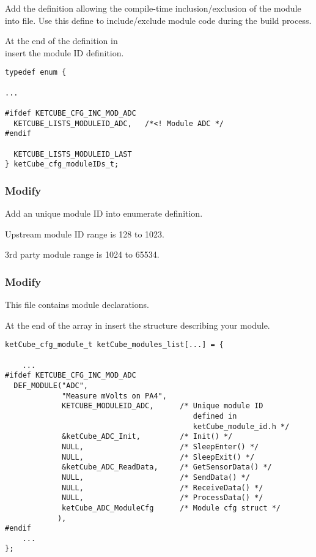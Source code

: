 Add the definition allowing the compile-time inclusion/exclusion of the module into  file.
Use this define to include/exclude module code during the build process.

At the end of the definition in\\ insert the module ID definition.

\begin{docCodeExample}
\begin{verbatim}
typedef enum {

...

#ifdef KETCUBE_CFG_INC_MOD_ADC
  KETCUBE_LISTS_MODULEID_ADC,   /*<! Module ADC */
#endif

  KETCUBE_LISTS_MODULEID_LAST
} ketCube_cfg_moduleIDs_t;
\end{verbatim}
\end{docCodeExample}

\subsubsection*{Modify }
Add an unique module ID into  enumerate definition.  

Upstream module ID range is 128 to 1023.

3rd party module range is 1024 to 65534.

\subsubsection*{Modify }

This file contains module declarations.

At the end of the array  in  insert the structure describing your module.

\begin{docCodeExample}
\begin{verbatim}
ketCube_cfg_module_t ketCube_modules_list[...] = {
    
    ...
#ifdef KETCUBE_CFG_INC_MOD_ADC
  DEF_MODULE("ADC",
             "Measure mVolts on PA4",
             KETCUBE_MODULEID_ADC,      /* Unique module ID 
                                           defined in 
                                           ketCube_module_id.h */
             &ketCube_ADC_Init,         /* Init() */
             NULL,                      /* SleepEnter() */
             NULL,                      /* SleepExit() */
             &ketCube_ADC_ReadData,     /* GetSensorData() */
             NULL,                      /* SendData() */
             NULL,                      /* ReceiveData() */
             NULL,                      /* ProcessData() */
             ketCube_ADC_ModuleCfg      /* Module cfg struct */
            ),
#endif
    ...
};
\end{verbatim}
\end{docCodeExample}

